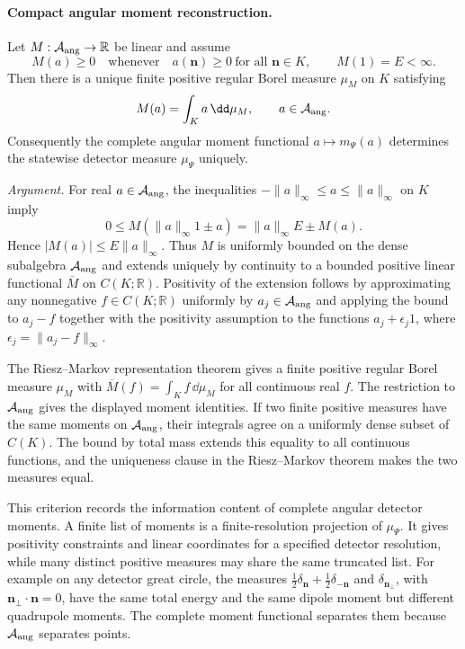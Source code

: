 \paragraph{Compact angular moment reconstruction.}
\label{par:cft-detector-compact-moment-reconstruction}
Let \(M:\mathcal A_{\rm ang}\to\mathbb R\) be linear and assume
\[
  M(a)\geq0
  \quad\text{whenever}\quad
  a(\mathbf n)\geq0\ \text{for all }\mathbf n\in K,
  \qquad
  M(1)=E<\infty .
\]
Then there is a unique finite positive regular Borel measure \(\mu_M\) on
\(K\) satisfying
\[
  M(a)=\int_K a\,\dd\mu_M,
  \qquad a\in\mathcal A_{\rm ang}.
\]
Consequently the complete angular moment functional
\(a\mapsto m_\Psi(a)\) determines the statewise detector measure
\(\mu_\Psi\) uniquely.

\emph{Argument.}
For real \(a\in\mathcal A_{\rm ang}\), the inequalities
\(-\|a\|_\infty\leq a\leq\|a\|_\infty\) on \(K\) imply
\[
  0\leq M(\|a\|_\infty 1\pm a)
  =
  \|a\|_\infty E\pm M(a).
\]
Hence \(|M(a)|\leq E\|a\|_\infty\).  Thus \(M\) is uniformly bounded on the
dense subalgebra \(\mathcal A_{\rm ang}\) and extends uniquely by continuity
to a bounded positive linear functional \(\overline M\) on
\(C(K;\mathbb R)\).  Positivity of the extension follows by approximating any
nonnegative \(f\in C(K;\mathbb R)\) uniformly by \(a_j\in\mathcal A_{\rm ang}\)
and applying the bound to \(a_j-f\) together with the positivity assumption
to the functions \(a_j+\epsilon_j 1\), where
\(\epsilon_j=\|a_j-f\|_\infty\).

The Riesz--Markov representation theorem gives a finite positive regular
Borel measure \(\mu_M\) with
\(\overline M(f)=\int_K f\,\dd\mu_M\) for all continuous real \(f\).  The
restriction to \(\mathcal A_{\rm ang}\) gives the displayed moment identities.
If two finite positive measures have the same moments on
\(\mathcal A_{\rm ang}\), their integrals agree on a uniformly dense subset
of \(C(K)\).  The bound by total mass extends this equality to all continuous
functions, and the uniqueness clause in the Riesz--Markov theorem makes the
two measures equal.

This criterion records the information content of complete angular detector
moments.  A finite list of moments is a finite-resolution projection of
\(\mu_\Psi\).  It gives positivity constraints and linear coordinates for a
specified detector resolution, while many distinct positive measures may
share the same truncated list.  For example on any detector great circle, the
measures \(\frac12\delta_{\mathbf n}+\frac12\delta_{-\mathbf n}\) and
\(\delta_{\mathbf n_\perp}\), with
\(\mathbf n_\perp\cdot\mathbf n=0\), have the same total energy and the same
dipole moment but different quadrupole moments.  The complete moment
functional separates them because \(\mathcal A_{\rm ang}\) separates points.

